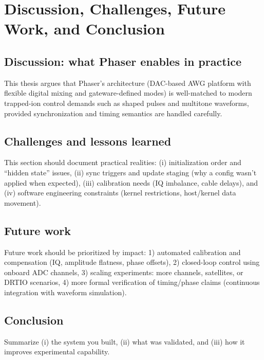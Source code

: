 \chapter{Discussion, Challenges, Future Work, and Conclusion}
\label{ch:discussion_future}

\section{Discussion: what Phaser enables in practice}
This thesis argues that Phaser’s architecture (DAC-based AWG platform with flexible digital mixing and
gateware-defined modes) is well-matched to modern trapped-ion control demands such as shaped pulses and
multitone waveforms, provided synchronization and timing semantics are handled carefully.


\section{Challenges and lessons learned}
This section should document practical realities:
(i) initialization order and “hidden state” issues,
(ii) sync triggers and update staging (why a config wasn’t applied when expected),
(iii) calibration needs (IQ imbalance, cable delays),
and (iv) software engineering constraints (kernel restrictions, host/kernel data movement).


\section{Future work}
Future work should be prioritized by impact:
1) automated calibration and compensation (IQ, amplitude flatness, phase offsets),
2) closed-loop control using onboard ADC channels,
3) scaling experiments: more channels, satellites, or DRTIO scenarios,
4) more formal verification of timing/phase claims (continuous integration with waveform simulation).

\section{Conclusion}
Summarize (i) the system you built, (ii) what was validated, and (iii) how it improves experimental capability.
